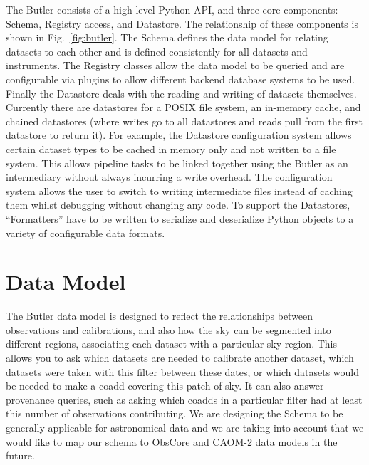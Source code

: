 \documentclass[11pt,twoside]{article}
\begin{document}
The Butler consists of a high-level Python API, and three core components: Schema, Registry access, and Datastore.
The relationship of these components is shown in Fig.~\ref{fig:butler}.
The Schema defines the data model for relating datasets to each other and is defined consistently for all datasets and instruments.
The Registry classes allow the data model to be queried and are configurable via plugins to allow different backend database systems to be used.
Finally the Datastore deals with the reading and writing of datasets themselves.
Currently there are datastores for a POSIX file system, an in-memory cache, and chained datastores (where writes go to all datastores and reads pull from the first datastore to return it).
For example, the Datastore configuration system allows certain dataset types to be cached in memory only and not written to a file system.
This allows pipeline tasks to be linked together using the Butler as an intermediary without always incurring a write overhead.
The configuration system allows the user to switch to writing intermediate files instead of caching them whilst debugging without changing any code.
To support the Datastores, ``Formatters'' have to be written to serialize and deserialize Python objects to a variety of configurable data formats.


\section{Data Model}

The Butler data model is designed to reflect the relationships between observations and calibrations, and also how the sky can be segmented into different regions, associating each dataset with a particular sky region.
This allows you to ask which datasets are needed to calibrate another dataset, which datasets were taken with this filter between these dates, or which datasets would be needed to make a coadd covering this patch of sky.
It can also answer provenance queries, such as asking which coadds in a particular filter had at least this number of observations contributing.
We are designing the Schema to be generally applicable for astronomical data and we are taking into account that we would like to map our schema to ObsCore \citep{2017ivoa.spec.0509L} and CAOM-2 \citep{2012ASPC..461..339D} data models in the future.
\end{document}
